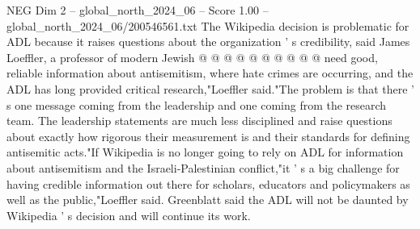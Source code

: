 \begin{textsample}{NEG Dim 2 – global\_north\_2024\_06 – Score 1.00 – global\_north\_2024\_06/200546561.txt}
The Wikipedia decision is problematic for ADL because it raises questions about the organization ' s credibility, said James Loeffler, a professor of modern Jewish @ @ @ @ @ @ @ @ @ @ need good, reliable information about antisemitism, where hate crimes are occurring, and the ADL has long provided critical research,"Loeffler said."The problem is that there ' s one message coming from the leadership and one coming from the research team.
The leadership statements are much less disciplined and raise questions about exactly how rigorous their measurement is and their standards for defining antisemitic acts."If Wikipedia is no longer going to rely on ADL for information about antisemitism and the Israeli-Palestinian conflict,"it ' s a big challenge for having credible information out there for scholars, educators and policymakers as well as the public,"Loeffler said.
Greenblatt said the ADL will not be daunted by Wikipedia ' s decision and will continue its work.

\end{textsample}
